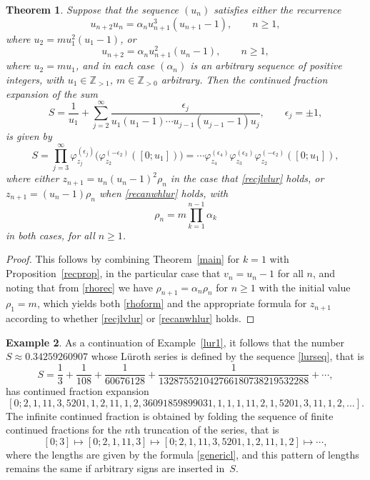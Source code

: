 \documentclass[12pt,a4paper]{amsart}
\newtheorem{theorem}{Theorem}[section]
\theoremstyle{definition}
\newtheorem{example}[theorem]{Example}
\numberwithin{equation}{section}
\newcommand\al{{\alpha}}
\newcommand\eps{{\epsilon}}
\newcommand{\Z}{\mathbb{Z}}
\begin{document}
\begin{theorem}
\label{lurthm}
Suppose that the sequence $(u_n)$ satisfies 
either the recurrence 
\begin{equation}
\label{recjlvlur}
u_{n+2}u_n = \al_{n} u_{n+1}^3 (u_{n+1}-1), \qquad n\geq 1, 
\end{equation} 
where $u_2=mu_1^2(u_1-1)$, 
or 
\begin{equation}
\label{recanwhlur} 
u_{n+2} = \al_{n} u_{n+1}^2(u_n-1), \qquad n\geq 1, 
\end{equation} 
where $u_2=mu_1$, and 
in each case $(\al_n)$ is an arbitrary sequence of positive integers, with
$u_1\in\Z_{>1}$, $m\in\Z_{>0}$ arbitrary. 
Then the continued fraction expansion of the sum 
\begin{equation}
\label{sluroth} 
  S = \frac{1}{u_1} +\sum_{j=2}^{\infty} \frac{\eps_j}{u_{1}(u_{1}-1) \cdots 
  u_{j-1}(u_{j-1}-1) u_{j}}, \qquad \eps_j=\pm 1,
\end{equation} 
is given by 
\begin{equation}
\label{lurcf}
  S = \prod_{j=3}^\infty \varphi_{z_j}^{(\eps_j)}
  \big( \varphi_{z_2}^{(-\eps_2)}([0; u_1])\big)  
  = \cdots \varphi_{z_4}^{(\eps_4)} \varphi_{z_3}^{(\eps_3)} 
  \varphi_{z_2}^{(-\eps_2)}([0; u_1]) ,
\end{equation} 
where either $z_{n+1} = u_{n}(u_{n}-1)^2\rho_{n}$ in the case that \eqref{recjlvlur} holds, 
or $z_{n+1} = (u_{n}-1)\rho_{n}$ when \eqref{recanwhlur} holds, with 
\begin{equation}
\label{rhoform} 
\rho_n = m \prod_{k=1}^{n-1}\al_k
\end{equation} 
in both cases, for all $n\geq 1$. 
\end{theorem} 

\begin{proof} 
This follows by combining Theorem~\ref{main} for $k=1$ with Proposition~\ref{recprop}, 
in the particular case that $v_n=u_n-1$ for all $n$, and noting that 
from \eqref{rhorec} 
we have $\rho_{n+1} = \al_n \rho_n$ for $n\geq 1$ with the initial value $\rho_1=m$, 
which yields both \eqref{rhoform} and the appropriate formula for $z_{n+1}$ according to 
whether \eqref{recjlvlur} or \eqref{recanwhlur} holds.
\end{proof}

\begin{example}
\label{lur1cont}
As a continuation of Example~\ref{lur1}, 
it follows that the number $S\approx 0.34259260907$ whose L\"uroth series %
is defined by the sequence \eqref{lurseq}, that is 
\[ 
S = \frac{1}{3}+\frac{1}{108}+\frac{1}{60676128}+\frac{1}{132875521042766180738219532288}+\cdots, 
\] 
has continued fraction expansion 
\small
\[
[0;2,1,11,3,5201,1,2,11,1,2,36091859899031,1,1,1,11,2,1,5201,3,11,1,2,\ldots].
\]
\normalsize
The infinite continued fraction is obtained by folding the sequence of finite continued fractions for 
the $n$th truncation of the series, that is 
\[
[0;3]\mapsto [0;2,1,11,3]\mapsto [0;2,1,11,3,5201,1,2,11,1,2]\mapsto \cdots,
\] 
where the lengths are given by the formula \eqref{genericl}, and this pattern of lengths 
remains the same if arbitrary signs are inserted in~$S$. 
\end{example} 
\end{document}
